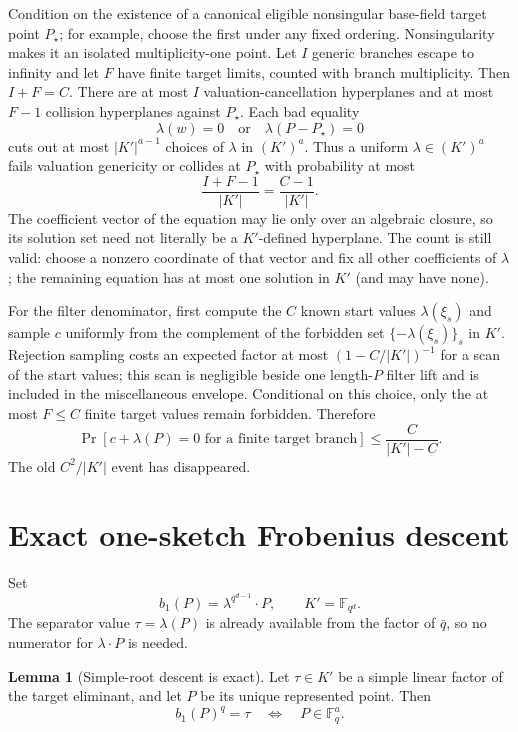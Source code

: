\documentclass[11pt,a4paper]{article}
\theoremstyle{definition}
\newtheorem{lemma}[theorem]{Lemma}
\theoremstyle{remark}
\newcommand{\F}{\mathbb F}
\begin{document}
Condition on the existence of a canonical eligible nonsingular base-field target point $P_\star$; for example, choose the first under any fixed ordering.  Nonsingularity makes it an isolated multiplicity-one point.  Let $I$ generic branches escape to infinity and let $F$ have finite target limits, counted with branch multiplicity.  Then $I+F=C$.  There are at most $I$ valuation-cancellation hyperplanes and at most $F-1$ collision hyperplanes against $P_\star$.  Each bad equality
\[
 \lambda(w)=0
 \quad\text{or}\quad
 \lambda(P-P_\star)=0
\]
cuts out at most $|K'|^{a-1}$ choices of $\lambda$ in $(K')^a$.  Thus a uniform $\lambda\in(K')^a$ fails valuation genericity or collides at $P_\star$ with probability at most
\begin{equation}\label{eq:lambdafail}
 \frac{I+F-1}{|K'|}=\frac{C-1}{|K'|}.
\end{equation}
The coefficient vector of the equation may lie only over an algebraic closure, so its solution set need not literally be a $K'$-defined hyperplane.  The count is still valid: choose a nonzero coordinate of that vector and fix all other coefficients of $\lambda$; the remaining equation has at most one solution in $K'$ (and may have none).

For the filter denominator, first compute the $C$ known start values $\lambda(\xi_s)$ and sample $c$ uniformly from the complement of the forbidden set $\{-\lambda(\xi_s)\}_s$ in $K'$.  Rejection sampling costs an expected factor at most $(1-C/|K'|)^{-1}$ for a scan of the start values; this scan is negligible beside one length-$P$ filter lift and is included in the miscellaneous envelope.  Conditional on this choice, only the at most $F\le C$ finite target values remain forbidden.  Therefore
\begin{equation}\label{eq:cfail}
 \Pr[c+\lambda(P)=0\text{ for a finite target branch}]
 \le \frac{C}{|K'|-C}.
\end{equation}
The old $C^2/|K'|$ event has disappeared.

\section{Exact one-sketch Frobenius descent}\label{sec:frob}

Set
\[
 b_1(P)=\lambda^{q^{d-1}}\!\cdot P,
 \qquad K'=\F_{q^d}.
\]
The separator value $\tau=\lambda(P)$ is already available from the factor of $\bar q$, so no numerator for $\lambda\cdot P$ is needed.

\begin{lemma}[Simple-root descent is exact]\label{lem:exactfrob}
Let $\tau\in K'$ be a simple linear factor of the target eliminant, and let $P$ be its unique represented point.  Then
\[
 b_1(P)^q=\tau
 \quad\Longleftrightarrow\quad
 P\in\F_q^a.
\]
\end{lemma}
\end{document}
